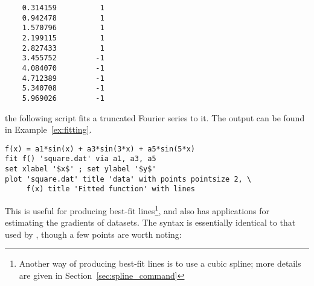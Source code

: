 \begin{verbatim}
    0.314159          1
    0.942478          1
    1.570796          1
    2.199115          1
    2.827433          1
    3.455752         -1
    4.084070         -1
    4.712389         -1
    5.340708         -1
    5.969026         -1
\end{verbatim}

\noindent the following script fits a truncated Fourier series to it.  The
output can be found in Example~\ref{ex:fitting}.

\begin{verbatim}
f(x) = a1*sin(x) + a3*sin(3*x) + a5*sin(5*x)
fit f() 'square.dat' via a1, a3, a5
set xlabel '$x$' ; set ylabel '$y$'
plot 'square.dat' title 'data' with points pointsize 2, \
     f(x) title 'Fitted function' with lines
\end{verbatim}


This is useful for producing best-fit lines\footnote{Another way of producing best-fit lines is to use a cubic
spline; more details are given in Section~\ref{sec:spline_command}}, and also has
applications for estimating the gradients of datasets.  The syntax is
essentially identical to that used by \gnuplot, though a few points are worth
noting:

